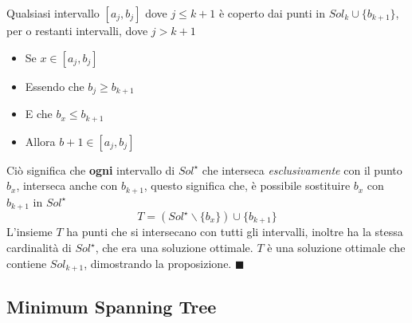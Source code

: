 \documentclass[12pt, letterpaper]{article}
\begin{document}
Qualsiasi intervallo $[a_j,b_j]$ dove $j\le k+1$ è coperto dai punti in $Sol_k\cup\{b_{k+1}\}$, per o restanti intervalli, 
dove $j>k+1$\begin{itemize}
    \item Se $x\in [a_j,b_j]$
    \item Essendo che $b_j\ge b_{k+1}$
    \item E che $b_x \le b_{k+1}$
    \item Allora $b+1\in [a_j,b_j]$
\end{itemize}
Ciò significa che \textbf{ogni} intervallo di $Sol^\star$ che interseca \textit{esclusivamente} con il punto $b_x$, interseca 
anche con $b_{k+1}$, questo significa che, è possibile sostituire $b_x$ con $b_{k+1}$ in $Sol^\star$
$$ T=(Sol^\star \backslash \{b_x\})\cup \{b_{k+1}\}$$ 
L'insieme $T$ ha punti che si intersecano con tutti gli intervalli, inoltre ha la stessa cardinalità di $Sol^\star$, che era una 
soluzione ottimale. $T$ è una soluzione ottimale che contiene $Sol_{k+1}$, dimostrando la proposizione. $\blacksquare$

\subsection{Minimum Spanning Tree} 
\end{document}

